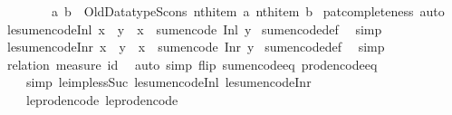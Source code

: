 \begin{isabellebody}
\ \ \ \ \ \ \ \ {\isacharparenleft}a{\isacharcomma}\ b{\isacharparenright}\ {\isasymRightarrow}\ Old{\isacharunderscore}Datatype{\isachardot}Scons\ {\isacharparenleft}nth{\isacharunderscore}item\ a{\isacharparenright}\ {\isacharparenleft}nth{\isacharunderscore}item\ b{\isacharparenright}{\isacharparenright}{\isacharparenright}{\isacharparenright}{\isachardoublequoteclose}\isanewline
%
\isadelimproof
%
\endisadelimproof
%
\isatagproof
{}\isamarkupfalse%
\ pat{\isacharunderscore}completeness\ auto%
\endisatagproof
{\isafoldproof}%
%
\isadelimproof
\isanewline
%
\endisadelimproof
\isanewline
{}\isamarkupfalse%
\ le{\isacharunderscore}sum{\isacharunderscore}encode{\isacharunderscore}Inl{\isacharcolon}\ {\isachardoublequoteopen}x\ {\isasymle}\ y\ {\isasymLongrightarrow}\ x\ {\isasymle}\ sum{\isacharunderscore}encode\ {\isacharparenleft}Inl\ y{\isacharparenright}{\isachardoublequoteclose}\isanewline
%
\isadelimproof
%
\endisadelimproof
%
\isatagproof
{}\isamarkupfalse%
\ sum{\isacharunderscore}encode{\isacharunderscore}def\ \isamarkupfalse%
\ simp%
\endisatagproof
{\isafoldproof}%
%
\isadelimproof
\isanewline
%
\endisadelimproof
\isanewline
{}\isamarkupfalse%
\ le{\isacharunderscore}sum{\isacharunderscore}encode{\isacharunderscore}Inr{\isacharcolon}\ {\isachardoublequoteopen}x\ {\isasymle}\ y\ {\isasymLongrightarrow}\ x\ {\isasymle}\ sum{\isacharunderscore}encode\ {\isacharparenleft}Inr\ y{\isacharparenright}{\isachardoublequoteclose}\isanewline
%
\isadelimproof
%
\endisadelimproof
%
\isatagproof
{}\isamarkupfalse%
\ sum{\isacharunderscore}encode{\isacharunderscore}def\ \isamarkupfalse%
\ simp\isanewline
\isanewline
{}%
\endisatagproof
{\isafoldproof}%
%
\isadelimproof
%
\endisadelimproof
\ \isamarkupfalse%
\isanewline
%
\isadelimproof
%
\endisadelimproof
%
\isatagproof
{}\isamarkupfalse%
\ {\isacharparenleft}relation\ {\isachardoublequoteopen}measure\ id{\isachardoublequoteclose}{\isacharparenright}\isanewline
\ \ {\isacharparenleft}auto\ simp\ flip{\isacharcolon}\ sum{\isacharunderscore}encode{\isacharunderscore}eq\ prod{\isacharunderscore}encode{\isacharunderscore}eq\isanewline
\ \ \ \ simp{\isacharcolon}\ le{\isacharunderscore}imp{\isacharunderscore}less{\isacharunderscore}Suc\ le{\isacharunderscore}sum{\isacharunderscore}encode{\isacharunderscore}Inl\ le{\isacharunderscore}sum{\isacharunderscore}encode{\isacharunderscore}Inr\isanewline
\ \ \ \ le{\isacharunderscore}prod{\isacharunderscore}encode{\isacharunderscore}{}\ le{\isacharunderscore}prod{\isacharunderscore}encode{\isacharunderscore}{}{\isacharparenright}%

\end{isabellebody}
